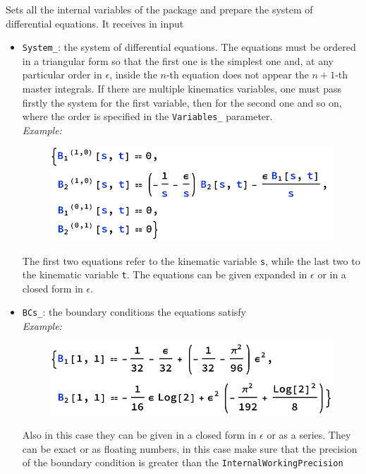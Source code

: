 \begin{itemize}
    Sets all the internal variables of the package and prepare the system of differential equations. It receives in input
    \begin{itemize}
        \item \texttt{System\_}: the system of differential equations. The equations must be ordered in a triangular form so that the first one is the simplest one and, at any particular order in $\epsilon$, inside the $n$-th equation does not appear the $n+1$-th master integrals. If there are multiple kinematics variables, one must pass firstly the system for the first variable, then for the second one and so on, where the order is specified in the \texttt{Variables\_} parameter.\\
        
        \textit{Example:}
        \begin{figure}[!h]
            \centering
            \includegraphics[scale=0.75]{Images/Code1.pdf}
        \end{figure}
        The first two equations refer to the kinematic variable \texttt{s}, while the last two to the kinematic variable \texttt{t}. The equations can be given expanded in $\epsilon$ or in a closed form in $\epsilon$.
        
        \item \texttt{BCs\_}: the boundary conditions the equations satisfy\\
        
        \textit{Example:}
        \begin{figure}[!h]
            \centering
            \includegraphics[scale=0.75]{Images/Code2.pdf}
        \end{figure}
        Also in this case they can be given in a closed form in $\epsilon$ or as a series. They can be exact or as floating numbers, in this case make sure that the precision of the boundary condition is greater than the \texttt{InternalWorkingPrecision}
        

\end{itemize}
\end{itemize}
